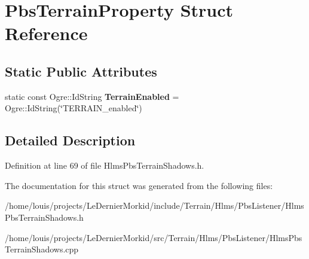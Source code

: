 \hypertarget{struct_pbs_terrain_property}{}\section{Pbs\+Terrain\+Property Struct Reference}
\label{struct_pbs_terrain_property}
\subsection*{Static Public Attributes}
\begin{DoxyCompactItemize}
\item 
\mbox{\label{struct_pbs_terrain_property_a8fecc53ec81dc75f241a916242417d12}} 
static const Ogre\+::\+Id\+String {\bfseries Terrain\+Enabled} = Ogre\+::\+Id\+String(\char`\"{}T\+E\+R\+R\+A\+I\+N\+\_\+enabled\char`\"{})
\end{DoxyCompactItemize}


\subsection{Detailed Description}


Definition at line 69 of file Hlms\+Pbs\+Terrain\+Shadows.\+h.



The documentation for this struct was generated from the following files\+:\begin{DoxyCompactItemize}
\item 
/home/louis/projects/\+Le\+Dernier\+Morkid/include/\+Terrain/\+Hlms/\+Pbs\+Listener/Hlms\+Pbs\+Terrain\+Shadows.\+h\item 
/home/louis/projects/\+Le\+Dernier\+Morkid/src/\+Terrain/\+Hlms/\+Pbs\+Listener/Hlms\+Pbs\+Terrain\+Shadows.\+cpp\end{DoxyCompactItemize}
